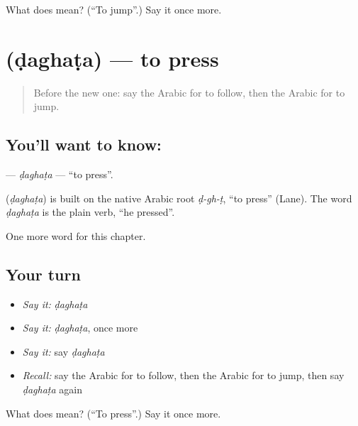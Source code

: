\begin{tcolorbox}[breakable,colback=teal!4,colframe=teal!35!black,title={Before you move on}]
What does  mean? (\textquotedblleft{}To jump\textquotedblright{}.) Say it once more.
\end{tcolorbox}
\section[\texorpdfstring{\ar{ضغط} (ḍaghaṭa)}{ضغط (ḍaghaṭa)}]{ (ḍaghaṭa) — to press}

\label{lesson:AR-C259-daghata}



\begin{quote}
Before the new one: say the Arabic for to follow, then the Arabic for to jump.
\end{quote}

\subsection*{You'll want to know: }
\textbf{} — \emph{ḍaghaṭa} — \textquotedblleft{}to press\textquotedblright{}.

\begin{cousinweb}
\textbf{} (\emph{ḍaghaṭa}) is built on the native Arabic root \emph{ḍ-gh-ṭ}, \textquotedblleft{}to press\textquotedblright{} (Lane). The word \emph{ḍaghaṭa} is the plain verb, \textquotedblleft{}he pressed\textquotedblright{}.
\end{cousinweb}

\begin{grammarlens}[title={What you've built}]
One more word for this chapter.
\end{grammarlens}

\subsection*{Your turn}
\begin{itemize}
\raggedright
  \item \emph{Say it:} \emph{ḍaghaṭa}
  \item \emph{Say it:} \emph{ḍaghaṭa}, once more
  \item \emph{Say it:} say \emph{ḍaghaṭa}
  \item \emph{Recall:} say the Arabic for to follow, then the Arabic for to jump, then say \emph{ḍaghaṭa} again
\end{itemize}

\begin{tcolorbox}[breakable,colback=teal!4,colframe=teal!35!black,title={Before you move on}]
What does  mean? (\textquotedblleft{}To press\textquotedblright{}.) Say it once more.
\end{tcolorbox}
